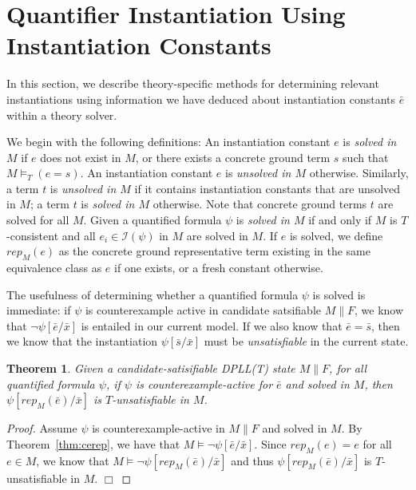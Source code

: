 \documentclass{llncs}
\newtheorem{thm}{Theorem}
\begin{document}
\section{Quantifier Instantiation Using Instantiation Constants}

In this section, we describe theory-specific methods for determining relevant instantiations using information we have deduced about instantiation constants $\bar{e}$ within a theory solver.

We begin with the following definitions:
An instantiation constant $e$ is \emph{solved in $M$} if $e$ does not exist in $M$, or there exists a concrete ground term $s$ such that $M \models_T (e = s)$.
An instantiation constant $e$ is \emph{unsolved in $M$} otherwise.
Similarly, a term $t$ is \emph{unsolved in $M$} if it contains instantiation constants that are unsolved in $M$; a term $t$ is \emph{solved in $M$} otherwise.
Note that concrete ground terms $t$ are solved for all $M$.
Given a quantified formula $\psi$ is \emph{solved in $M$} if and only if $M$ is $T$-consistent and all $e_i \in \mathcal{I}( \psi )$ in $M$ are solved in $M$.
If $e$ is solved, we define $rep_M( e )$ as the concrete ground representative term existing in the same equivalence class as $e$ if one exists, or a fresh constant otherwise.

The usefulness of determining whether a quantified formula $\psi$ is solved is immediate:  if $\psi$ is counterexample active in candidate satsifiable $M \parallel F$, we know that $\neg \psi[ \bar{e}/\bar{x} ]$ is entailed in our current model.
If we also know that $\bar{e} = \bar{s}$, then we know that the instantiation $\psi[ \bar{s}/\bar{x} ]$ must be \emph{unsatisfiable} in the current state.

\begin{thm}
\label{thm:instready}
Given a candidate-satisifiable DPLL(T) state $M \parallel F$, for all quantified formula $\psi$, if $\psi$ is counterexample-active for $\bar{e}$ and solved in $M$, then $\psi[rep_M( \bar{e} )/\bar{x}]$ is $T$-unsatisfiable in $M$.
\end{thm}
\begin{proof}
Assume $\psi$ is counterexample-active in $M \parallel F$ and solved in $M$.
By Theorem~\ref{thm:cerep}, we have that $M \models \neg \psi[\bar{e}/\bar{x}]$.
Since $rep_M( e ) = e$ for all $e \in M$, we know that $M \models \neg \psi[rep_M( \bar{e} )/\bar{x}]$ and thus $\psi[rep_M( \bar{e} )/\bar{x}]$ is $T$-unsatisfiable in $M$. $\Box$
\end{proof}
\end{document}
